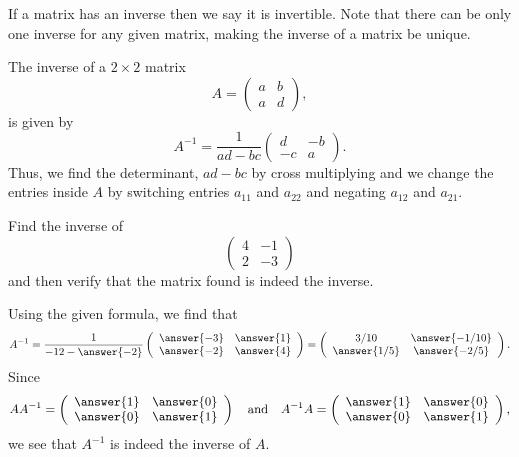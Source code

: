 \documentclass{ximera}
\begin{document}
If a matrix has an inverse then we say it is invertible. Note that
there can be only one inverse for any given matrix, making the inverse
of a matrix be unique.

The inverse of a $2\times 2$ matrix
\[
  A =
  \left(\begin{array}{cc}
    a & b  \\
    a &  d
  \end{array}\right),
\]
is given by
\[
A^{-1}=  \frac{1}{ad-bc} \left(\begin{array}{cc}
  d & -b  \\
  -c &  a
\end{array}\right).
\]
Thus, we find the determinant, $ad-bc$ by cross multiplying and we change the entries inside $A$ by switching entries $a_{11}$ and $a_{22}$ and negating $a_{12}$ and $a_{21}$.

\begin{question}
  Find the inverse of
  \[
    \left(
      \begin{array}{cc}
        4 & -1 \\
        2 & -3
      \end{array}
    \right)
  \]
  and then verify that the matrix found is indeed the inverse.
  \begin{prompt}
    Using the given formula, we find that
    \[
      A^{-1}=  \frac{1}{-12-\answer{-2}}
      \left(
        \begin{array}{cc}
          \answer{-3} &  \answer{1} \\
          \answer{-2} &  \answer{4}
        \end{array}
      \right)
      = \left(
        \begin{array}{cc}
          3/10 &  \answer{-1/10} \\
          \answer{1/5} &  \answer{-2/5}
        \end{array}
      \right).
    \]
    Since
    \[
      AA^{-1}= \left(
        \begin{array}{cc}
          \answer{1} &  \answer{0} \\
          \answer{0} &  \answer{1}
        \end{array}
      \right)
      \quad\text{and}\quad
      A^{-1}A= \left(
        \begin{array}{cc}
          \answer{1} &  \answer{0} \\
          \answer{0} &  \answer{1}
        \end{array}
      \right),
    \]
    we see that $A^{-1}$ is indeed the inverse of $A$.
  \end{prompt}
\end{question}
\end{document}
